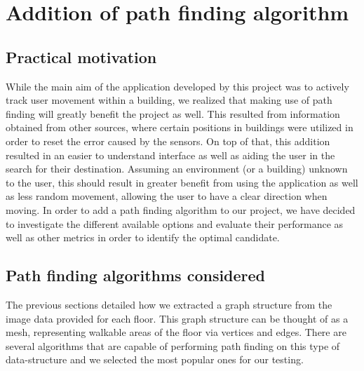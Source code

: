 \documentclass[main.tex]{subfiles}
\begin{document}
\section{Addition of path finding algorithm}

\subsection{Practical motivation}
While the main aim of the application developed by this project was to actively track user movement within a building, we realized that making use of path finding will greatly benefit the project as well. This resulted from information obtained from other sources, where certain positions in buildings were utilized in order to reset the error caused by the sensors. On top of that, this addition resulted in an easier to understand interface as well as aiding the user in the search for their destination. Assuming an environment (or a building) unknown to the user, this should result in greater benefit from using the application as well as less random movement, allowing the user to have a clear direction when moving. In order to add a path finding algorithm to our project, we have decided to investigate the different available options and evaluate their performance as well as other metrics in order to identify the optimal candidate.

\subsection{Path finding algorithms considered}
The previous sections detailed how we extracted a graph structure from the image data provided for each floor. This graph structure can be thought of as a mesh, representing walkable areas of the floor via vertices and edges. There are several algorithms that are capable of performing path finding on this type of data-structure and we selected the most popular ones for our testing. 
\end{document}
